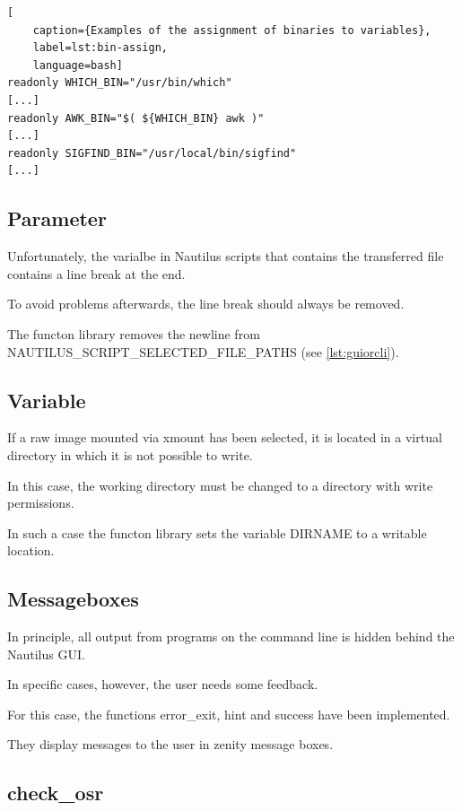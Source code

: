 \begin{lstlisting}[
    caption={Examples of the assignment of binaries to variables},
    label=lst:bin-assign,
    language=bash]
readonly WHICH_BIN="/usr/bin/which"
[...]
readonly AWK_BIN="$( ${WHICH_BIN} awk )"
[...]
readonly SIGFIND_BIN="/usr/local/bin/sigfind"
[...]
\end{lstlisting}

\subsection{Parameter}

Unfortunately, the varialbe in Nautilus scripts that contains the transferred file contains a line break at the end.

To avoid problems afterwards, the line break should always be removed.

The functon library removes the newline from NAUTILUS\_SCRIPT\_SELECTED\_FILE\_PATHS (see \cref{lst:guiorcli}).

\subsection{Variable}

If a raw image mounted via xmount has been selected, it is located in a virtual directory in which it is not possible to write.

In this case, the working directory must be changed to a directory with write permissions.

In such a case the functon library sets the variable DIRNAME to a writable location.

\subsection{Messageboxes}

In principle, all output from programs on the command line is hidden behind the Nautilus GUI.

In specific cases, however, the user needs some feedback.

For this case, the functions error\_exit, hint and success have been implemented.

They display messages to the user in zenity message boxes.

\subsection{check\_osr}

